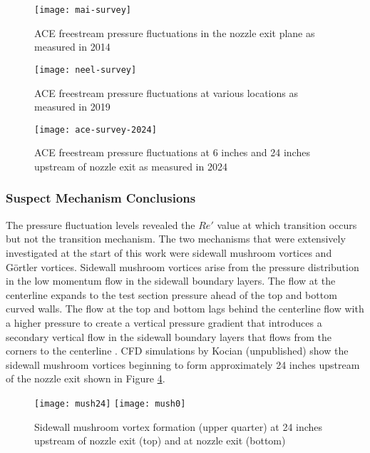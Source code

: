 \begin{figure}[ht!]
    \centering
    \texttt{[image: mai-survey]}
    \caption[ACE freestream pressure fluctuations in the nozzle exit plane as measured in 2014]{ACE freestream pressure fluctuations in the nozzle exit plane as measured in 2014 \cite{mai-dis}}
    \label{fig:mai-survey}
\end{figure}

\begin{figure}[ht!]
    \centering
    \texttt{[image: neel-survey]}
    \caption[ACE freestream pressure fluctuations at various locations as measured in 2019]{ACE freestream pressure fluctuations at various locations as measured in 2019 \cite{neel-dis}}
    \label{fig:neel-survey}
\end{figure}

\clearpage

\begin{figure}[ht!]
    \centering
    \texttt{[image: ace-survey-2024]}
    \caption{ACE freestream pressure fluctuations at 6 inches and 24 inches upstream of nozzle exit as measured in 2024}
    \label{fig:ace-survey-2024}
\end{figure}

\subsubsection*{Suspect Mechanism Conclusions}

The pressure fluctuation levels revealed the $Re'$ value at which transition occurs but not the transition mechanism. The two mechanisms that were extensively investigated at the start of this work were sidewall mushroom vortices and Görtler vortices. Sidewall mushroom vortices arise from the pressure distribution in the low momentum flow in the sidewall boundary layers. The flow at the centerline expands to the test section pressure ahead of the top and bottom curved walls. The flow at the top and bottom lags behind the centerline flow with a higher pressure to create a vertical pressure gradient that introduces a secondary vertical flow in the sidewall boundary layers that flows from the corners to the centerline \cite{sabnis}. CFD simulations by Kocian (unpublished) show the sidewall mushroom vortices beginning to form approximately 24 inches upstream of the nozzle exit shown in Figure \ref{fig:mushrooms}. 

\begin{figure}[ht!]
    \centering
    \texttt{[image: mush24]}
    \texttt{[image: mush0]}
    \caption{Sidewall mushroom vortex formation (upper quarter) at 24 inches upstream of nozzle exit (top) and at nozzle exit (bottom) }
    \label{fig:mushrooms}
\end{figure}

